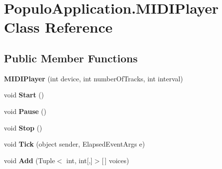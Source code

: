 \hypertarget{class_populo_application_1_1_m_i_d_i_player}{\section{Populo\+Application.\+M\+I\+D\+I\+Player Class Reference}
\label{class_populo_application_1_1_m_i_d_i_player}
}
\subsection*{Public Member Functions}
\begin{DoxyCompactItemize}
\item 
\hypertarget{class_populo_application_1_1_m_i_d_i_player_a0823f764c3cbfd3627b60d2c108056a2}{{\bfseries M\+I\+D\+I\+Player} (int device, int number\+Of\+Tracks, int interval)}\label{class_populo_application_1_1_m_i_d_i_player_a0823f764c3cbfd3627b60d2c108056a2}

\item 
\hypertarget{class_populo_application_1_1_m_i_d_i_player_a505b4bfce27dc991d04431a840c9df4d}{void {\bfseries Start} ()}\label{class_populo_application_1_1_m_i_d_i_player_a505b4bfce27dc991d04431a840c9df4d}

\item 
\hypertarget{class_populo_application_1_1_m_i_d_i_player_a77c3144d6d8900541b3ea2b3a3d7d24b}{void {\bfseries Pause} ()}\label{class_populo_application_1_1_m_i_d_i_player_a77c3144d6d8900541b3ea2b3a3d7d24b}

\item 
\hypertarget{class_populo_application_1_1_m_i_d_i_player_a467a3c2662628f43e2a4da5ad1fdcc1e}{void {\bfseries Stop} ()}\label{class_populo_application_1_1_m_i_d_i_player_a467a3c2662628f43e2a4da5ad1fdcc1e}

\item 
\hypertarget{class_populo_application_1_1_m_i_d_i_player_a273e31c34b35bb0358f1f02082a55888}{void {\bfseries Tick} (object sender, Elapsed\+Event\+Args e)}\label{class_populo_application_1_1_m_i_d_i_player_a273e31c34b35bb0358f1f02082a55888}

\item 
\hypertarget{class_populo_application_1_1_m_i_d_i_player_a8b8e5bf6144ba59a7ff02bc9dfba01be}{void {\bfseries Add} (Tuple$<$ int, int\mbox{[},\mbox{]}$>$\mbox{[}$\,$\mbox{]} voices)}\label{class_populo_application_1_1_m_i_d_i_player_a8b8e5bf6144ba59a7ff02bc9dfba01be}

\end{DoxyCompactItemize}
